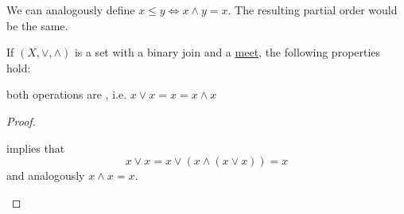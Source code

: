 \begin{remark}\label{remark:binary_join_meet_order}
  We can analogously define \( x \leq y \iff x \wedge y = x \). The resulting partial order would be the same.
\end{remark}

\begin{proposition}\label{thm:binary_join_meet_properties}
  If \( (X, \vee, \wedge) \) is a set with a binary join and a \hyperref[def:binary_join_meet]{meet}, the following properties hold:
  \begin{defenum}
     both operations are , i.e. \( x \vee x = x = x \wedge x \)
  \end{defenum}
\end{proposition}
\begin{proof}\mbox{}
  \begin{description}
      implies that
    \begin{equation*}
      x \vee x = x \vee (x \wedge (x \vee x)) = x
    \end{equation*}
    and analogously \( x \wedge x = x \).
  \end{description}
\end{proof}

